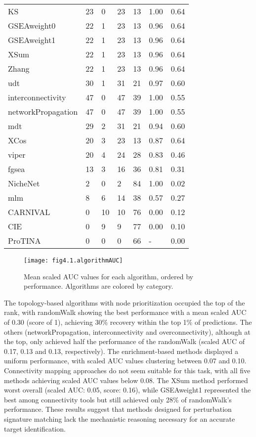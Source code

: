 \begin{table}[]
\begin{tabular}{lllllll}
KS & 23 & 0 & 23 & 13 & 1.00 & 0.64 \\
GSEAweight0 & 22 & 1 & 23 & 13 & 0.96 & 0.64 \\
GSEAweight1 & 22 & 1 & 23 & 13 & 0.96 & 0.64 \\
XSum & 22 & 1 & 23 & 13 & 0.96 & 0.64 \\
Zhang & 22 & 1 & 23 & 13 & 0.96 & 0.64 \\
udt & 30 & 1 & 31 & 21 & 0.97 & 0.60 \\
interconnectivity & 47 & 0 & 47 & 39 & 1.00 & 0.55 \\
networkPropagation & 47 & 0 & 47 & 39 & 1.00 & 0.55 \\
mdt & 29 & 2 & 31 & 21 & 0.94 & 0.60 \\
XCos & 20 & 3 & 23 & 13 & 0.87 & 0.64 \\
viper & 20 & 4 & 24 & 28 & 0.83 & 0.46 \\
fgsea & 13 & 3 & 16 & 36 & 0.81 & 0.31 \\
NicheNet & 2 & 0 & 2 & 84 & 1.00 & 0.02 \\
mlm & 8 & 6 & 14 & 38 & 0.57 & 0.27 \\
CARNIVAL & 0 & 10 & 10 & 76 & 0.00 & 0.12 \\
CIE & 0 & 9 & 9 & 77 & 0.00 & 0.10 \\
ProTINA & 0 & 0 & 0 & 66 & - & 0.00 \\ \hline
\end{tabular}
\end{table}

\begin{figure}[htbp]
    \centering
    \texttt{[image: fig4.1.algorithmAUC]}
    \caption[Mean scaled \gls{AUC} values for each algorithm.]{Mean scaled \gls{AUC} values for each algorithm, ordered by performance. Algorithms are colored by category.}
    \label{fig:fig4.1.algorithmAUC}
\end{figure}

The topology-based algorithms with node prioritization occupied the top of the rank, with randomWalk showing the best performance with a mean scaled \gls{AUC} of 0.30 (score of 1), achieving 30\% recovery within the top 1\% of predictions. The others (networkPropagation, interconnectivity and overconnectivity), although at the top, only achieved half the performance of the randomWalk (scaled \gls{AUC} of 0.17, 0.13 and 0.13, respectively). The enrichment-based methods displayed a uniform performance, with scaled \gls{AUC} values clustering between 0.07 and 0.10. Connectivity mapping approaches do not seem suitable for this task, with all five methods achieving scaled \gls{AUC} values below 0.08. The XSum method performed worst overall (scaled \gls{AUC}: 0.05, score: 0.16), while GSEAweight1 represented the best among connectivity tools but still achieved only 28\% of randomWalk's performance. These results suggest that methods designed for perturbation signature matching lack the mechanistic reasoning necessary for an accurate target identification.

